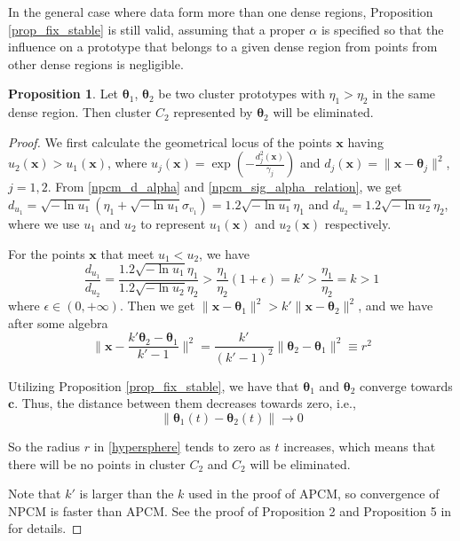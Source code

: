 \documentclass[journal]{IEEEtran}
\theoremstyle{definition}
\newtheorem*{proof}{Proof}
\newtheorem{prop}{Proposition}
\begin{document}
In the general case where data form more than one dense regions, Proposition \ref{prop_fix_stable} is still valid, assuming that a proper $\alpha$ is specified so that the influence on a prototype that belongs to a given dense region from points from other dense regions is negligible.

\begin{prop}
Let $\boldsymbol{\theta}_1$, $\boldsymbol{\theta}_2$ be two cluster prototypes with $\eta_1>\eta_2$ in the same dense region. Then cluster $C_2$ represented by $\boldsymbol{\theta}_2$ will be eliminated.
\label{prop_eliminate}
\end{prop}

\begin{proof}
 We first calculate the geometrical locus of the points $\mathbf{x}$ having $u_2(\mathbf{x})>u_1(\mathbf{x})$, where $u_j(\mathbf{x})=\exp\left(-\frac{d_j^2(\mathbf{x})}{\gamma_j}\right)$ and $d_j(\mathbf{x})=\|\mathbf{x} - \boldsymbol{\theta}_j\|^2$, $j=1,2$.
From \eqref{npcm_d_alpha} and \eqref{npcm_sig_alpha_relation}, we get $d_{u_1}=\sqrt{-\ln u_1}\left(\eta_1+\sqrt{-\ln u_1}\sigma_{v_1}\right)=1.2\sqrt{-\ln u_1}\eta_1$ and $d_{u_2}=1.2\sqrt{-\ln u_2}\eta_2$, where we use $u_1$ and $u_2$ to represent $u_1(\mathbf{x})$ and $u_2(\mathbf{x})$ respectively. 

For the points $\mathbf{x}$ that meet $u_1<u_2$, we have 
\begin{equation*}
\frac{d_{u_1}}{d_{u_2}}=\frac{1.2\sqrt{-\ln u_1}\eta_1}{1.2\sqrt{-\ln u_2}\eta_2}>\frac{\eta_1}{\eta_2}(1+\epsilon)=k'>\frac{\eta_1}{\eta_2}=k>1
\end{equation*}
where $\epsilon\in(0,+\infty)$. Then we get $\|\mathbf{x} - \boldsymbol{\theta}_1\|^2 > k'\|\mathbf{x} - \boldsymbol{\theta}_2\|^2$, and we have after some algebra
\begin{equation}
\label{hypersphere}
\|\mathbf{x}-\frac{k'\boldsymbol{\theta}_2-\boldsymbol{\theta}_1}{k'-1}\|^2 = \frac{k'}{(k'-1)^2}\|\boldsymbol{\theta}_2-\boldsymbol{\theta}_1\|^2\equiv r^2
\end{equation}

Utilizing Proposition \ref{prop_fix_stable}, we have that $\boldsymbol{\theta}_1$ and $\boldsymbol{\theta}_2$ converge towards $\mathbf{c}$. Thus, the distance between them decreases towards zero, i.e., 
\begin{equation}
\|\boldsymbol{\theta}_1(t)-\boldsymbol{\theta}_2(t)\|\rightarrow 0
\label{eqprop51}
\end{equation}          

So the radius $r$ in \eqref{hypersphere} tends to zero as $t$ increases, which means that there will be no points in cluster $C_2$ and $C_2$ will be eliminated.

Note that $k'$ is larger than the $k$ used in the proof of APCM, so convergence of NPCM is faster than APCM. 
See the proof of Proposition 2 and Proposition 5 in \cite{xenaki_novel_2016} for details.
\end{proof}






\end{document}
